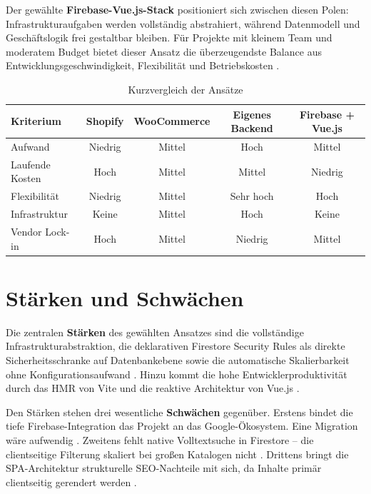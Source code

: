 Der gewählte \textbf{Firebase-Vue.js-Stack} positioniert sich zwischen diesen Polen: Infrastrukturaufgaben werden vollständig abstrahiert, während Datenmodell und Geschäftslogik frei gestaltbar bleiben. Für Projekte mit kleinem Team und moderatem Budget bietet dieser Ansatz die überzeugendste Balance aus Entwicklungsgeschwindigkeit, Flexibilität und Betriebskosten \cite{uunonen2023, nguyen_ecom2022}.

\begin{table}[H]
\centering
\begin{tabularx}{\textwidth}{Xcccc}
\toprule
\textbf{Kriterium} & \textbf{Shopify} & \textbf{WooCommerce} & \textbf{Eigenes Backend} & \textbf{Firebase + Vue.js} \\
\midrule
Aufwand & Niedrig & Mittel & Hoch & Mittel \\
\midrule
Laufende Kosten & Hoch & Mittel & Mittel & Niedrig \\
\midrule
Flexibilität & Niedrig & Mittel & Sehr hoch & Hoch \\
\midrule
Infrastruktur & Keine & Mittel & Hoch & Keine \\
\midrule
Vendor Lock-in & Hoch & Mittel & Niedrig & Mittel \\
\bottomrule
\end{tabularx}
\caption{Kurzvergleich der Ansätze}
\label{tab:alternativvergleich}
\end{table}

\section{Stärken und Schwächen}
\label{sec:staerken-schwaechen}

Die zentralen \textbf{Stärken} des gewählten Ansatzes sind die vollständige Infrastrukturabstraktion, die deklarativen Firestore Security Rules als direkte Sicherheitsschranke auf Datenbankebene sowie die automatische Skalierbarkeit ohne Konfigurationsaufwand \cite{milojkovic2024, thatikonda2023}. Hinzu kommt die hohe Entwicklerproduktivität durch das HMR von Vite und die reaktive Architektur von Vue.js \cite{emmanni2023}.

Den Stärken stehen drei wesentliche \textbf{Schwächen} gegenüber. Erstens bindet die tiefe Firebase-Integration das Projekt an das Google-Ökosystem. Eine Migration wäre aufwendig \cite{kylliainen2022}. Zweitens fehlt native Volltextsuche in Firestore -- die clientseitige Filterung skaliert bei großen Katalogen nicht \cite{kesavan2023}. Drittens bringt die SPA-Architektur strukturelle SEO-Nachteile mit sich, da Inhalte primär clientseitig gerendert werden \cite{kowalczyk2024}.

